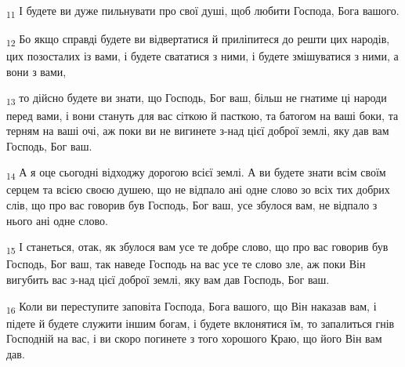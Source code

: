 \begin{tcolorbox}
\textsubscript{11} І будете ви дуже пильнувати про свої душі, щоб любити Господа, Бога вашого.
\end{tcolorbox}
\begin{tcolorbox}
\textsubscript{12} Бо якщо справді будете ви відвертатися й приліпитеся до решти цих народів, цих позосталих із вами, і будете свататися з ними, і будете змішуватися з ними, а вони з вами,
\end{tcolorbox}
\begin{tcolorbox}
\textsubscript{13} то дійсно будете ви знати, що Господь, Бог ваш, більш не гнатиме ці народи перед вами, і вони стануть для вас сіткою й пасткою, та батогом на ваші боки, та терням на ваші очі, аж поки ви не вигинете з-над цієї доброї землі, яку дав вам Господь, Бог ваш.
\end{tcolorbox}
\begin{tcolorbox}
\textsubscript{14} А я оце сьогодні відходжу дорогою всієї землі. А ви будете знати всім своїм серцем та всією своєю душею, що не відпало ані одне слово зо всіх тих добрих слів, що про вас говорив був Господь, Бог ваш, усе збулося вам, не відпало з нього ані одне слово.
\end{tcolorbox}
\begin{tcolorbox}
\textsubscript{15} І станеться, отак, як збулося вам усе те добре слово, що про вас говорив був Господь, Бог ваш, так наведе Господь на вас усе те слово зле, аж поки Він вигубить вас з-над цієї доброї землі, яку вам дав Господь, Бог ваш.
\end{tcolorbox}
\begin{tcolorbox}
\textsubscript{16} Коли ви переступите заповіта Господа, Бога вашого, що Він наказав вам, і підете й будете служити іншим богам, і будете вклонятися їм, то запалиться гнів Господній на вас, і ви скоро погинете з того хорошого Краю, що його Він вам дав.
\end{tcolorbox}
